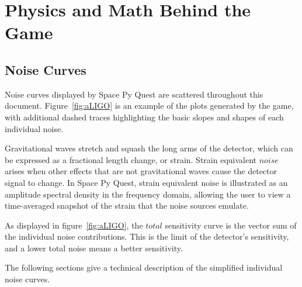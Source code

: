 \documentclass{article}
\begin{document}
\section{Physics and Math Behind the Game}
\label{sec:theory}

\subsection{Noise Curves}
Noise curves displayed by Space Py Quest are scattered
throughout this document. Figure~\ref{fig:aLIGO} is an example of the
plots generated by the game, with additional dashed traces
highlighting the basic slopes and shapes of each individual noise.

Gravitational waves stretch and squash the long arms
of the detector, which can be expressed as a fractional length
change, or strain. Strain equivalent $noise$ arises when other effects
that are  not gravitational waves cause the detector signal to
change. In Space Py Quest, strain equivalent noise is illustrated as
an amplitude spectral density in the frequency domain, allowing the
user to view a time-averaged snapshot of the strain that the noise
sources emulate.

As displayed in figure~\ref{fig:aLIGO}, the $total$ sensitivity curve
is the vector sum of the individual noise contributions. This is the
limit of the detector's sensitivity, and a lower total noise means a
better sensitivity.

The following sections give a technical description of the simplified
individual noise curves.
\end{document}
